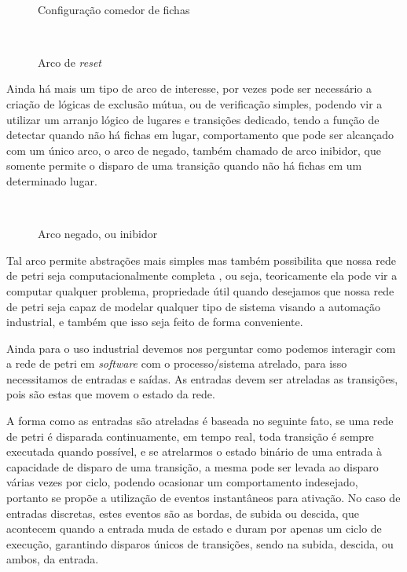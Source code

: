 \begin{figure}[ht]
	\centering
	\caption{Configuração comedor de fichas}
	\\
	\label{fig:comedor}
\end{figure}

\begin{figure}[ht]
	\centering
	\caption{Arco de \textit{reset}}
	\\
	\label{fig:reset}
\end{figure}

Ainda há mais um tipo de arco de interesse, por vezes pode ser necessário a criação de lógicas de exclusão mútua, ou de verificação simples, podendo vir a utilizar um arranjo lógico de lugares e transições dedicado, tendo a função de detectar quando não há fichas em lugar, comportamento que pode ser alcançado com um único arco, o arco de negado, também chamado de arco inibidor, que somente permite o disparo de uma transição quando não há fichas em um determinado lugar.

\begin{figure}[ht]
	\centering
	\caption{Arco negado, ou inibidor}
	\\
	\label{fig:negado}
\end{figure}

Tal arco permite abstrações mais simples mas também possibilita que nossa rede de petri seja computacionalmente completa \cite{petrinetTuringComplete}, ou seja, teoricamente ela pode vir a computar qualquer problema, propriedade útil quando desejamos que nossa rede de petri seja capaz de modelar qualquer tipo de sistema visando a automação industrial, e também que isso seja feito de forma conveniente.  

Ainda para o uso industrial devemos nos perguntar como podemos interagir com a rede de petri em \textit{software} com o processo/sistema atrelado, para isso necessitamos de entradas e saídas. As entradas devem ser atreladas as transições, pois são estas que movem o estado da rede.

A forma como as entradas são atreladas é baseada no seguinte fato, se uma rede de petri é disparada continuamente, em tempo real, toda transição é sempre executada quando possível, e se atrelarmos o estado binário de uma entrada à capacidade de disparo de uma transição, a mesma pode ser levada ao disparo várias vezes por ciclo, podendo ocasionar um comportamento indesejado, portanto se propõe a utilização de eventos instantâneos para ativação. No caso de entradas discretas, estes eventos são as bordas, de subida ou descida, que acontecem quando a entrada muda de estado e duram por apenas um ciclo de execução, garantindo disparos únicos de transições, sendo na subida, descida, ou ambos, da entrada.

